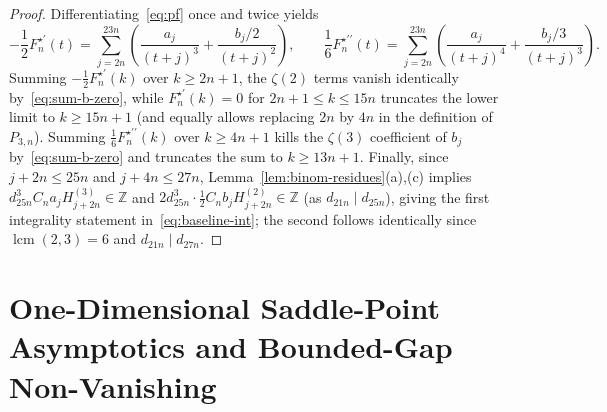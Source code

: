 \documentclass[11pt,reqno]{amsart}
\theoremstyle{definition}
\theoremstyle{remark}
\newcommand{\ZZ}{\mathbb{Z}}
\newcommand{\lcm}{\operatorname{lcm}}
\begin{document}
\begin{proof}
Differentiating~\eqref{eq:pf} once and twice yields
\[
  -\frac{1}{2} F_n^{\star\prime}(t) = \sum_{j=2n}^{23n} \left(\frac{a_j}{(t+j)^3} + \frac{b_j/2}{(t+j)^2}\right),
  \qquad
  \frac{1}{6} F_n^{\star\prime\prime}(t) = \sum_{j=2n}^{23n} \left(\frac{a_j}{(t+j)^4} + \frac{b_j/3}{(t+j)^3}\right).
\]
Summing $-\frac{1}{2} F_n^{\star\prime}(k)$ over $k \ge 2n + 1$, the $\zeta(2)$ terms vanish identically by~\eqref{eq:sum-b-zero}, while $F_n^{\star\prime}(k) = 0$ for $2n + 1 \le k \le 15n$ truncates the lower limit to $k \ge 15n + 1$ (and equally allows replacing $2n$ by $4n$ in the definition of $P_{3,n}$). Summing $\frac{1}{6} F_n^{\star\prime\prime}(k)$ over $k \ge 4n + 1$ kills the $\zeta(3)$ coefficient of $b_j$ by~\eqref{eq:sum-b-zero} and truncates the sum to $k \ge 13n + 1$. Finally, since $j + 2n \le 25n$ and $j + 4n \le 27n$, Lemma~\ref{lem:binom-residues}(a),(c) implies $d_{25n}^3 C_n a_j H_{j+2n}^{(3)} \in \ZZ$ and $2 d_{25n}^3 \cdot \frac{1}{2} C_n b_j H_{j+2n}^{(2)} \in \ZZ$ (as $d_{21n} \mid d_{25n}$), giving the first integrality statement in~\eqref{eq:baseline-int}; the second follows identically since $\lcm(2, 3) = 6$ and $d_{21n} \mid d_{27n}$.
\end{proof}

\section{One-Dimensional Saddle-Point Asymptotics and Bounded-Gap Non-Vanishing}
\label{sec:asymp}
\end{document}
